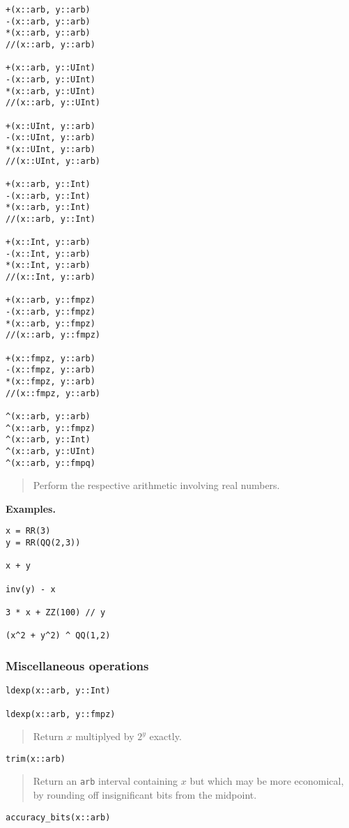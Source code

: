\documentclass[a4paper,10pt]{article}
\newcommand{\code}{\lstinline}
\newcommand{\desc}[1]{\vspace{-3mm}\begin{quote}#1\end{quote}}
\begin{document}
{{\begin{lstlisting}
+(x::arb, y::arb)
-(x::arb, y::arb)
*(x::arb, y::arb)
//(x::arb, y::arb)

+(x::arb, y::UInt)
-(x::arb, y::UInt)
*(x::arb, y::UInt)
//(x::arb, y::UInt)

+(x::UInt, y::arb)
-(x::UInt, y::arb)
*(x::UInt, y::arb)
//(x::UInt, y::arb)

+(x::arb, y::Int)
-(x::arb, y::Int)
*(x::arb, y::Int)
//(x::arb, y::Int)

+(x::Int, y::arb)
-(x::Int, y::arb)
*(x::Int, y::arb)
//(x::Int, y::arb)

+(x::arb, y::fmpz)
-(x::arb, y::fmpz)
*(x::arb, y::fmpz)
//(x::arb, y::fmpz)

+(x::fmpz, y::arb)
-(x::fmpz, y::arb)
*(x::fmpz, y::arb)
//(x::fmpz, y::arb)

^(x::arb, y::arb)
^(x::arb, y::fmpz)
^(x::arb, y::Int)
^(x::arb, y::UInt)
^(x::arb, y::fmpq)
\end{lstlisting}

\desc{Perform the respective arithmetic involving real numbers.}

\textbf{Examples.}

\begin{lstlisting}
x = RR(3)
y = RR(QQ(2,3))

x + y

inv(y) - x

3 * x + ZZ(100) // y

(x^2 + y^2) ^ QQ(1,2)
\end{lstlisting}

\subsubsection{Miscellaneous operations}

\begin{lstlisting}
ldexp(x::arb, y::Int)

ldexp(x::arb, y::fmpz)
\end{lstlisting}

\desc{Return $x$ multiplyed by $2^y$ exactly.}

\begin{lstlisting}
trim(x::arb)
\end{lstlisting}

\desc{Return an \code{arb} interval containing $x$ but which may be more economical,
by rounding off insignificant bits from the midpoint.}

\begin{lstlisting}
accuracy_bits(x::arb)
\end{lstlisting}

}}
\end{document}
